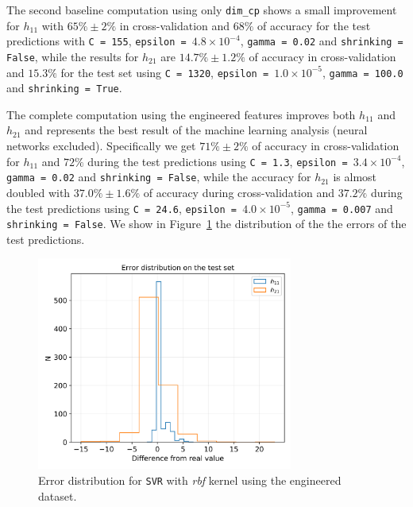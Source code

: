     The second baseline computation using only \texttt{dim\_cp} shows a small improvement for $h_{11}$ with $65\% \pm 2\%$ in cross-validation and $68\%$ of accuracy for the test predictions with \texttt{C = 155}, \texttt{epsilon = $4.8 \times 10^{-4}$}, \texttt{gamma = 0.02} and \texttt{shrinking = False}, while the results for $h_{21}$ are $14.7\% \pm 1.2\%$ of accuracy in cross-validation and $15.3\%$ for the test set using \texttt{C = 1320}, \texttt{epsilon = $1.0 \times 10^{-5}$}, \texttt{gamma = 100.0} and \texttt{shrinking = True}.
    
    The complete computation using the engineered features improves both $h_{11}$ and $h_{21}$ and represents the best result of the machine learning analysis (neural networks excluded). Specifically we get $71\% \pm 2\%$ of accuracy in cross-validation for $h_{11}$ and $72\%$ during the test predictions using \texttt{C = 1.3}, \texttt{epsilon = $3.4 \times 10^{-4}$}, \texttt{gamma = 0.02} and \texttt{shrinking = False}, while the accuracy for $h_{21}$ is almost doubled with $37.0\% \pm 1.6\%$ of accuracy during cross-validation and $37.2\%$ during the test predictions using \texttt{C = 24.6}, \texttt{epsilon = $4.0 \times 10^{-5}$}, \texttt{gamma = 0.007} and \texttt{shrinking = False}. We show in Figure~\ref{fig:svr_rbf_err} the distribution of the the errors of the test predictions.
    
    \begin{figure}[t]
        \centering
        \includegraphics[width=0.75\textwidth]{tex/img/svr_rbf_error_eng.png}
        \caption{Error distribution for \texttt{SVR} with \textit{rbf} kernel using the engineered dataset.}
        \label{fig:svr_rbf_err}
    \end{figure}
    
